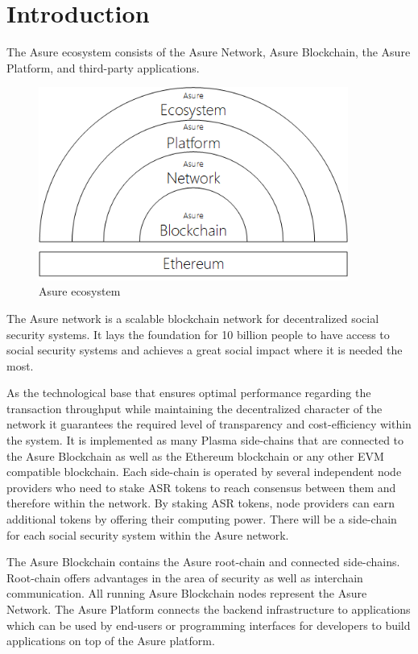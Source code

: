 \section{Introduction}
The Asure ecosystem consists of the Asure Network, Asure Blockchain, the Asure Platform, and third-party applications. 

\begin{figure}[H]
    \centering
    \includegraphics[width=4.0in]{img/ecosystem.png}
    \caption{Asure ecosystem}
    \label{fig:asure_ecosystem}
\end{figure}

The Asure network is a scalable blockchain network for decentralized social security systems. It lays the foundation for 10 billion people to have access to social security systems and achieves a great social impact where it is needed the most. \cite{worldometers} 

As the technological base that ensures optimal performance regarding the transaction throughput while maintaining the decentralized character of the network it guarantees the required level of transparency and cost-efficiency within the system. It is implemented as many Plasma side-chains that are connected to the Asure Blockchain as well as the Ethereum blockchain or any other EVM compatible blockchain. Each side-chain is operated by several independent node providers who need to stake ASR tokens to reach consensus between them and therefore within the network. By staking ASR tokens, node providers can earn additional tokens by offering their computing power. There will be a side-chain for each social security system within the Asure network.

The Asure Blockchain contains the Asure root-chain and connected side-chains. Root-chain offers advantages in the area of security as well as interchain communication. All running Asure Blockchain nodes represent the Asure Network. The Asure Platform connects the backend infrastructure to applications which can be used by end-users or programming interfaces for developers to build applications on top of the Asure platform. 



